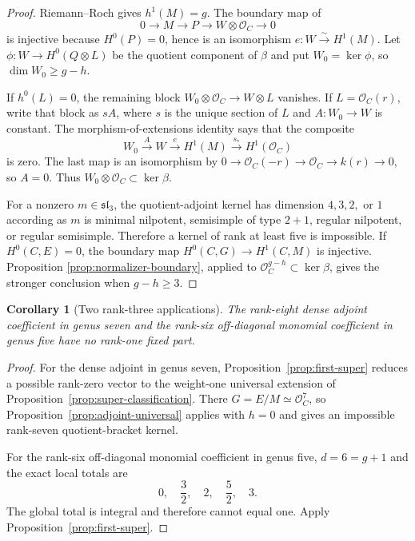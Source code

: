\documentclass[11pt]{article}
\newtheorem{corollary}[theorem]{Corollary}
\theoremstyle{definition}
\newcommand{\Ocal}{\mathcal O}
\begin{document}
\begin{proof}
Riemann--Roch gives $h^1(M)=g$.  The boundary map of
\[
 0\to M\to P\to W\otimes\Ocal_C\to0
\]
is injective because $H^0(P)=0$, hence is an isomorphism
$e:W\xrightarrow{\sim}H^1(M)$.  Let
$\phi:W\to H^0(Q\otimes L)$ be the quotient component of $\beta$ and put
$W_0=\ker\phi$, so $\dim W_0\ge g-h$.

If $h^0(L)=0$, the remaining block
$W_0\otimes\Ocal_C\to W\otimes L$ vanishes.  If
$L=\Ocal_C(r)$, write that block as $sA$, where $s$ is the unique section
of $L$ and $A:W_0\to W$ is constant.  The morphism-of-extensions identity
says that the composite
\[
 W_0\xrightarrow{A}W\xrightarrow{e}H^1(M)
 \xrightarrow{s_*}H^1(\Ocal_C)
\]
is zero.  The last map is an isomorphism by
$0\to\Ocal_C(-r)\to\Ocal_C\to k(r)\to0$, so $A=0$.  Thus
$W_0\otimes\Ocal_C\subset\ker\beta$.

For a nonzero $m\in\mathfrak{sl}_3$, the quotient-adjoint kernel has
dimension $4,3,2,$ or $1$ according as $m$ is minimal nilpotent,
semisimple of type $2+1$, regular nilpotent, or regular semisimple.
Therefore a kernel of rank at least five is impossible.  If $H^0(C,E)=0$,
the boundary map
$H^0(C,G)\to H^1(C,M)$ is injective.  Proposition
\ref{prop:normalizer-boundary}, applied to
$\Ocal_C^{g-h}\subset\ker\beta$, gives the stronger conclusion when
$g-h\ge3$.
\end{proof}

\begin{corollary}[Two rank-three applications]
\label{cor:first-super-apps}
The rank-eight dense adjoint coefficient in genus seven and the rank-six
off-diagonal monomial coefficient in genus five have no rank-one fixed part.
\end{corollary}

\begin{proof}
For the dense adjoint in genus seven, Proposition~\ref{prop:first-super}
reduces a possible rank-zero vector to the weight-one universal extension of
Proposition~\ref{prop:super-classification}.  There $G=E/M\simeq\Ocal_C^7$,
so Proposition~\ref{prop:adjoint-universal} applies with $h=0$ and gives an
impossible rank-seven quotient-bracket kernel.

For the rank-six off-diagonal monomial coefficient in genus five,
$d=6=g+1$ and the exact local totals are
\[
 0,\quad\frac32,\quad2,\quad\frac52,\quad3.
\]
The global total is integral and therefore cannot equal one.  Apply
Proposition~\ref{prop:first-super}.
\end{proof}
\end{document}
